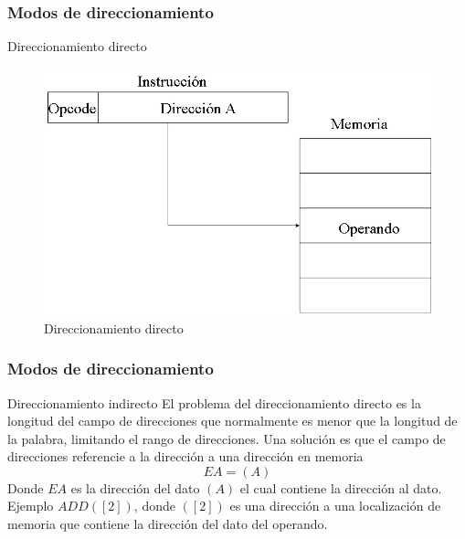 \documentclass{beamer}
\begin{document}
\begin{frame}
	\frametitle{Modos de direccionamiento}
	\begin{block}{Direccionamiento directo}
	\begin{figure}[H]
	\centering
	\includegraphics[scale=0.4]{imagenes/directo.jpg}
	\caption{Direccionamiento directo}
	\end{figure}			
	\end{block}		 		
\end{frame}

\begin{frame}
	\frametitle{Modos de direccionamiento}
	\begin{block}{Direccionamiento indirecto} \justify
		El problema del direccionamiento directo es la longitud del campo de direcciones que normalmente es menor que la longitud de la palabra, limitando el rango de direcciones. Una solución es que el campo de direcciones referencie a la dirección a una dirección en memoria
		\begin{equation}
			EA = (A)
		\end{equation}
		Donde $EA$ es la dirección del dato $(A)$ el cual contiene la dirección al dato. Ejemplo $ADD ([2])$, donde $([2])$ es una dirección a una localización de memoria que contiene la dirección del dato del operando.				
	\end{block}		 		
\end{frame}
\end{document}
